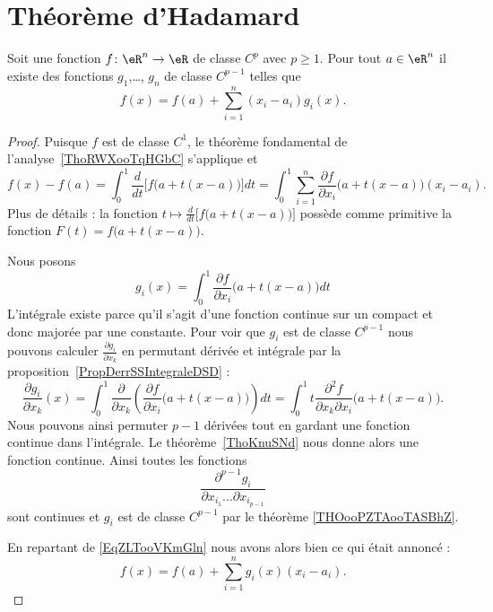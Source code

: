 \section{Théorème d'Hadamard}


\begin{lemma}   \label{LemWNBooGPlIwT}
	Soit une fonction \( f\colon \eR^n\to \eR\) de classe \( C^p\) avec \( p\geq 1\). Pour tout \( a\in \eR^n\) il existe des fonctions \( g_1\),\ldots, \( g_n\) de classe \( C^{p-1}\) telles que
	\begin{equation}
		f(x)=f(a)+\sum_{i=1}^n(x_i-a_i)g_i(x).
	\end{equation}
\end{lemma}

\begin{proof}
	Puisque \( f\) est de classe \( C^1\), le théorème fondamental de l'analyse~\ref{ThoRWXooTqHGbC} s'applique et
	\begin{equation}    \label{EqZLTooVKmGln}
		f(x)-f(a)=\int_0^1\frac{ d }{ dt }\Big[ f\big( a+t(x-a) \big) \Big]dt=\int_0^1\sum_{i=1}^n\frac{ \partial f }{ \partial x_i }\big( a+t(x-a) \big)(x_i-a_i).
	\end{equation}
	Plus de détails : la fonction \( t\mapsto \frac{ d }{ dt }\Big[ f\big( a+t(x-a) \big) \Big]\) possède comme primitive la fonction \( F(t)=f\big( a+t(x-a) \big)\).

	Nous posons
	\begin{equation}
		g_i(x)=\int_0^1\frac{ \partial f }{ \partial x_i }\big( a+t(x-a) \big)dt
	\end{equation}
	L'intégrale existe parce qu'il s'agit d'une fonction continue sur un compact et donc majorée par une constante. Pour voir que \( g_i\) est de classe \( C^{p-1}\) nous pouvons calculer \( \frac{ \partial g_i }{ \partial x_k }\) en permutant dérivée et intégrale par la proposition~\ref{PropDerrSSIntegraleDSD} :
	\begin{equation}
		\frac{ \partial g_i }{ \partial x_k }(x)=\int_0^1\frac{ \partial  }{ \partial x_k }\left( \frac{ \partial f }{ \partial x_i }\big( a+t(x-a) \big) \right)dt=\int_0^1 t\frac{ \partial^2f }{ \partial x_k\partial x_i }\big( a+t(x-a) \big).
	\end{equation}
	Nous pouvons ainsi permuter \( p-1\) dérivées tout en gardant une fonction continue dans l'intégrale. Le théorème~\ref{ThoKnuSNd} nous donne alors une fonction continue. Ainsi toutes les fonctions
	\begin{equation}
		\frac{ \partial^{p-1}g_i }{ \partial x_{i_1}\ldots\partial x_{i_{p-1}} }
	\end{equation}
	sont continues et \( g_i\) est de classe \( C^{p-1}\) par le théorème \ref{THOooPZTAooTASBhZ}.

	En repartant de \eqref{EqZLTooVKmGln} nous avons alors bien ce qui était annoncé :
	\begin{equation}
		f(x)=f(a)+\sum_{i=1}^ng_i(x)(x_i-a_i).
	\end{equation}
\end{proof}

